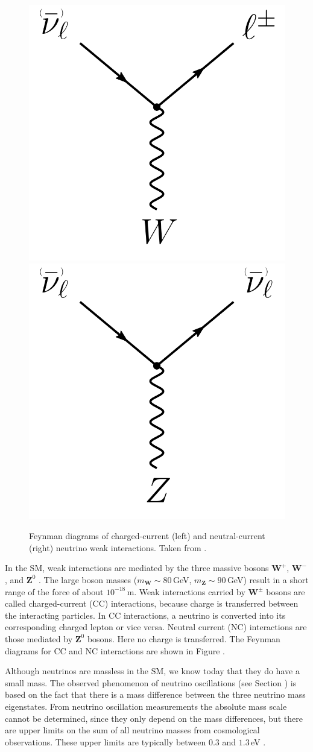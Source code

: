 \begin{figure}
	\centering
    \includegraphics[width=0.25\linewidth]{figures/neutrinos_properties/feynman_CC_nu.pdf}
    \hspace{1cm}
    \includegraphics[width=0.25\linewidth]{figures/neutrinos_properties/feynman_NC_nu.pdf}
    \caption[Feynman diagrams of neutrino weak interactions, taken from \cite{ATerliuk}]
    {Feynman diagrams of charged-current (left) and neutral-current (right) neutrino weak interactions. Taken from \cite{ATerliuk}.}
    \label{fig:weak_interactions}
\end{figure}

In the SM, weak interactions are mediated by the three massive bosons $\textbf{W}^+$, $\textbf{W}^-$, and $\textbf{Z}^0$ .
The large boson masses ($m_{\textbf{W}}\sim80$\,GeV, $m_{\textbf{Z}}\sim90$\,GeV) result in a short range of the force of about $10^{-18}$\,m.
Weak interactions carried by $\textbf{W}^\pm$ bosons are called charged-current (CC) interactions, because charge is transferred between the interacting particles.
In CC interactions, a neutrino is converted into its corresponding charged lepton or vice versa.
Neutral current (NC) interactions are those mediated by $\textbf{Z}^0$ bosons.
Here no charge is transferred.
The Feynman diagrams for CC and NC interactions are shown in Figure .

Although neutrinos are massless in the SM, we know today that they do have a small mass.
The observed phenomenon of neutrino oscillations (see Section ) is based on the fact that there is a mass difference between the three neutrino mass eigenstates.
From neutrino oscillation measurements the absolute mass scale cannot be determined, since they only depend on the mass differences, but there are upper limits on the sum of all neutrino masses from cosmological observations.
These upper limits are typically between $0.3$ and $1.3$\,eV .


